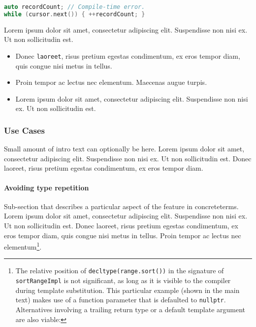 \documentclass[twoside,10pt,letterpaper,usenames]{newstyle-PearsonGeneric-7-38}
\begin{document}
\begin{lstlisting}[language=C++, caption={missing caption}, label={testlabel}, frame=tb]
auto recordCount; // Compile-time error.
while (cursor.next()) { ++recordCount; }
\end{lstlisting}
    

Lorem ipsum dolor sit amet, consectetur adipiscing elit. Suspendisse non
nisi ex. Ut non sollicitudin est.

\begin{itemize}
\item
  Donec \texttt{laoreet}, risus pretium egestas condimentum, ex eros
  tempor diam, quis congue nisi metus in tellus.
\item
  Proin tempor ac lectus nec elementum. Maecenas augue turpis.
\item
  Lorem ipsum dolor sit amet, consectetur adipiscing elit. Suspendisse
  non nisi ex. Ut non sollicitudin est.
\end{itemize}

\subsubsection[Use Cases]{Use Cases}\label{use-cases}

Small amount of intro text can optionally be here. Lorem ipsum dolor sit
amet, consectetur adipiscing elit. Suspendisse non nisi ex. Ut non
sollicitudin est. Donec laoreet, risus pretium egestas condimentum, ex
eros tempor diam.

\paragraph[Avoiding type repetition]{Avoiding type repetition}\label{avoiding-type-repetition}

Sub-section that describes a particular aspect of the feature in
concreteterms. Lorem ipsum dolor sit amet, consectetur adipiscing elit.
Suspendisse non nisi ex. Ut non sollicitudin est. Donec laoreet, risus
pretium egestas condimentum, ex eros tempor diam, quis congue nisi metus
in tellus. Proin tempor ac lectus nec elementum{\cprotect\footnote{The
  relative position of \texttt{decltype(range.sort())} in the signature
  of \texttt{sortRangeImpl} is not significant, as long as it is visible
  to the compiler during template substitution. This particular example
  (shown in the main text) makes use of a function parameter that is
  defaulted to \texttt{nullptr}. Alternatives involving a trailing
  return type or a default template argument are also viable:}}.
\end{document}
